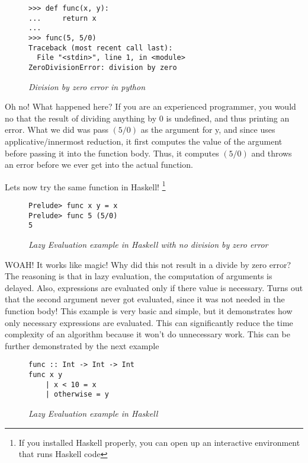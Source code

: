 \documentclass{article}
\begin{document}
\begin{figure}[H]
    \begin{lstlisting}
>>> def func(x, y):
...     return x
... 
>>> func(5, 5/0)
Traceback (most recent call last):
  File "<stdin>", line 1, in <module>
ZeroDivisionError: division by zero
    \end{lstlisting}
    \caption{\textit{Division by zero error in python}}
\end{figure}

\medskip\noindent
Oh no! What happened here? If you are an experienced programmer, you would no that the result of dividing anything by 0 is undefined, and thus printing an error. What we did was pass $(5/0)$ as the argument for y, and since uses applicative/innermost reduction, it first computes the value of the argument before passing it into the function body. Thus, it computes $(5/0)$ and throws an error before we ever get into the actual function. 

\medskip\noindent
Lets now try the same function in Haskell! \footnote{If you installed Haskell properly, you can open up an interactive environment that runs Haskell code}

\begin{figure}[H]
    \begin{lstlisting}
Prelude> func x y = x
Prelude> func 5 (5/0)
5
    \end{lstlisting}
    \caption{\textit{Lazy Evaluation example in Haskell with no division by zero error}}
\end{figure}

\medskip\noindent
WOAH! It works like magic! Why did this not result in a divide by zero error? The reasoning is that in lazy evaluation, the computation of arguments is delayed. Also, expressions are evaluated only if there value is necessary. Turns out that the second argument never got evaluated, since it was not needed in the function body! This example is very basic and simple, but it demonstrates how only necessary expressions are evaluated. This can significantly reduce the time complexity of an algorithm because it won't do unnecessary work. This can be further demonstrated by the next example

\begin{figure}[H]
    \begin{lstlisting}
func :: Int -> Int -> Int
func x y 
    | x < 10 = x
    | otherwise = y
    \end{lstlisting}
    \caption{\textit{Lazy Evaluation example in Haskell}}
\end{figure}
\end{document}
